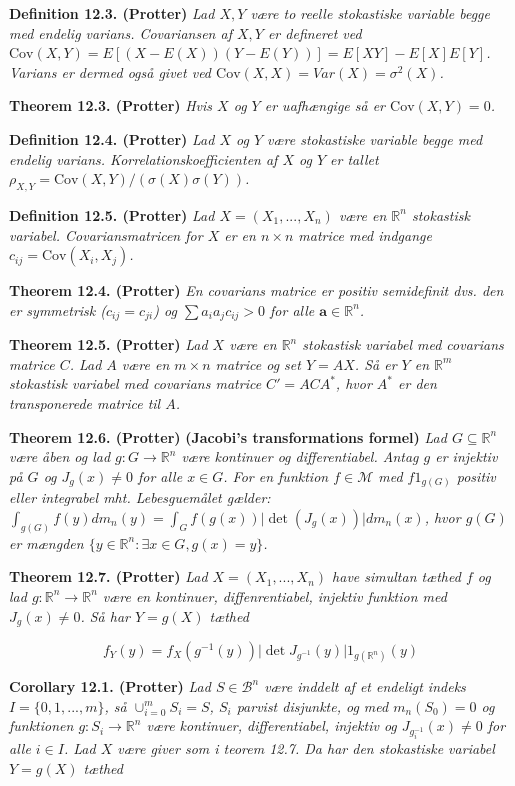 \documentclass[
]{book}
\begin{document}
\textbf{Definition 12.3. (Protter)} \emph{Lad \(X,Y\) være to reelle stokastiske variable begge med endelig varians. Covariansen af \(X,Y\) er defineret ved \(\text{Cov}(X,Y)=E[(X-E(X))(Y-E(Y))]=E[XY]-E[X]E[Y]\). Varians er dermed også givet ved \(\text{Cov}(X,X)=Var(X)=\sigma ^2(X)\).}

\textbf{Theorem 12.3. (Protter)} \emph{Hvis \(X\) og \(Y\) er uafhængige så er \(\text{Cov}(X,Y)=0\).}

\textbf{Definition 12.4. (Protter)} \emph{Lad \(X\) og \(Y\) være stokastiske variable begge med endelig varians. Korrelationskoefficienten af \(X\) og \(Y\) er tallet \(\rho_{X,Y}=\text{Cov}(X,Y)/(\sigma(X)\sigma(Y))\).}

\textbf{Definition 12.5. (Protter)} \emph{Lad \(X=(X_1,...,X_n)\) være en \(\mathbb{R}^n\) stokastisk variabel. Covariansmatricen for \(X\) er en \(n\times n\) matrice med indgange \(c_{ij}=\text{Cov}(X_i,X_j)\).}

\textbf{Theorem 12.4. (Protter)} \emph{En covarians matrice er positiv semidefinit dvs. den er symmetrisk (\(c_{ij}=c_{ji}\)) og \(\sum a_ia_jc_{ij}>0\) for alle \(\mathbf{a}\in\mathbb{R}^n\).}

\textbf{Theorem 12.5. (Protter)} \emph{Lad \(X\) være en \(\mathbb{R}^n\) stokastisk variabel med covarians matrice \(C\). Lad \(A\) være en \(m\times n\) matrice og set \(Y=AX\). Så er \(Y\) en \(\mathbb{R}^m\) stokastisk variabel med covarians matrice \(C'=ACA^*\), hvor \(A^*\) er den transponerede matrice til \(A\).}

\textbf{Theorem 12.6. (Protter)} \textbf{(Jacobi's transformations formel)} \emph{Lad \(G\subseteq \mathbb{R}^n\) være åben og lad \(g : G \to \mathbb{R}^n\) være kontinuer og differentiabel. Antag \(g\) er injektiv på \(G\) og \(J_g(x)\ne0\) for alle \(x\in G\). For en funktion \(f\in\mathcal{M}\) med \(f1_{g(G)}\) positiv eller integrabel mht. Lebesguemålet gælder: \(\int_{g(G)}f(y)dm_n(y)=\int_G f(g(x))\vert \det(J_g(x))\vert dm_n(x)\), hvor \(g(G)\) er mængden \(\{y\in\mathbb{R}^n : \exists x\in G, g(x)=y\}\).}

\textbf{Theorem 12.7. (Protter)} \emph{Lad \(X=(X_1,...,X_n)\) have simultan tæthed \(f\) og lad \(g : \mathbb{R}^n\to\mathbb{R}^n\) være en kontinuer, diffenrentiabel, injektiv funktion med \(J_g(x)\ne 0\). Så har \(Y=g(X)\) tæthed}

\[
f_Y(y)=f_X(g^{-1}(y))\vert \det J_{g^{-1}}(y)\vert 1_{g(\mathbb{R}^n)}(y)
\]

\textbf{Corollary 12.1. (Protter)} \emph{Lad \(S\in\mathcal{B}^n\) være inddelt af et endeligt indeks \(I=\{0,1,...,m\}\), så \(\cup_{i=0}^m S_i=S\), \(S_i\) parvist disjunkte, og med \(m_n(S_0)=0\) og funktionen \(g : S_i \to\mathbb{R}^n\) være kontinuer, differentiabel, injektiv og \(J_{g_i^{-1}}(x)\ne 0\) for alle \(i\in I\). Lad \(X\) være giver som i teorem 12.7. Da har den stokastiske variabel \(Y=g(X)\) tæthed}
\end{document}
